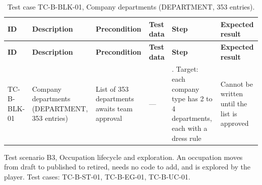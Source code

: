 {\footnotesize{}\renewcommand{\arraystretch}{1.1}
\begin{longtable}{|>{\raggedright\arraybackslash}p{}|>{\raggedright\arraybackslash}p{}|>{\raggedright\arraybackslash}p{}|>{\raggedright\arraybackslash}p{}|>{\raggedright\arraybackslash}p{}|>{\raggedright\arraybackslash}p{}|}
\caption{Test case TC-\allowbreak{}B-\allowbreak{}BLK-\allowbreak{}01, Company departments (DEPARTMENT, 353 entries).} \\
\hline
\textbf{ID} & \textbf{Description} & \textbf{Precondition} & \textbf{Test data} & \textbf{Step} & \textbf{Expected result} \\ \hline
\endfirsthead
\hline
\textbf{ID} & \textbf{Description} & \textbf{Precondition} & \textbf{Test data} & \textbf{Step} & \textbf{Expected result} \\ \hline
\endhead
TC-B-BLK-01 & Company departments (DEPARTMENT, 353 entries) & List of 353 departments awaits team approval & --- & 1. Target: each company type has 2 to 4 departments, each with a dress rule & Cannot be written until the list is approved \\ \hline
\end{longtable}
}

Test scenario B3, Occupation lifecycle and exploration. An occupation moves from draft to published to retired, needs no code to add, and is explored by the player. Test cases: TC-B-ST-01, TC-B-EG-01, TC-B-UC-01.

